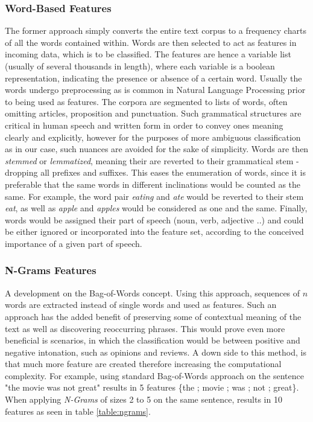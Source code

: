 		\subsubsection{Word-Based Features}
			The former approach simply converts the entire text corpus to a frequency charts of all the words contained within. Words are then selected to act as features in incoming data, which is to be classified. The features are hence a variable list (usually of several thousands in length), where each variable is a boolean representation, indicating the presence or absence of a certain word. Usually the words undergo preprocessing as is common in Natural Language Processing prior to being used as features. The corpora are segmented to lists of words, often omitting articles, proposition and punctuation. Such grammatical structures are critical in human speech and written form in order to convey ones meaning clearly and explicitly, however for the purposes of more ambiguous classification as in our case, such nuances are avoided for the sake of simplicity. Words are then \textit{stemmed} or \textit{lemmatized}, meaning their are reverted to their grammatical stem - dropping all prefixes and suffixes. This eases the enumeration of words, since it is preferable that the same words in different inclinations would be counted as the same. For example, the word pair \textit{eating} and \textit{ate} would be reverted to their stem \textit{eat}, as well as \textit{apple} and \textit{apples} would be considered as one and the same. Finally, words would be assigned their part of speech (noun, verb, adjective ..) and could be either ignored or incorporated into the feature set, according to the conceived importance of a given part of speech.
		
		\subsubsection{N-Grams Features}
			A development on the Bag-of-Words concept. Using this approach, sequences of $ n $ words are extracted instead of single words and used as features. Such an approach has the added benefit of preserving some of contextual meaning of the text as well as discovering reoccurring phrases. This would prove even more beneficial is scenarios, in which the classification would be between positive and negative intonation, such as opinions and reviews. A down side to this method, is that much more feature are created therefore increasing the computational complexity. For example, using standard Bag-of-Words approach on the sentence "the movie was not great" results in 5 features \{the ; movie ; was ; not ; great\}. When applying \textit{N-Grams} of sizes 2 to 5 on the same sentence, results in 10 features as seen in table \ref{table:ngrams}.
			
